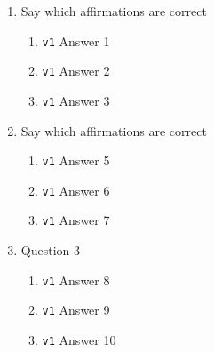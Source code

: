 \documentclass{article}
\begin{document}
\begin{enumerate}
\item Say which affirmations are correct
\begin{enumerate}
	\item \verb+v1+ Answer 1
	\item \verb+v1+ Answer 2
	\item \verb+v1+ Answer 3
\end{enumerate}

\item Say which affirmations are correct
\begin{enumerate}	
	\item \verb+v1+ Answer 5
	\item \verb+v1+ Answer 6
	\item \verb+v1+ Answer 7
\end{enumerate}

\item Question 3
\begin{enumerate}
	\item \verb+v1+ Answer 8
	\item \verb+v1+ Answer 9
	\item \verb+v1+ Answer 10
\end{enumerate}

\end{enumerate}

\end{document}
